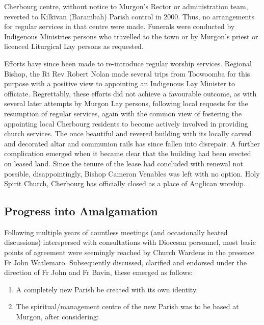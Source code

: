 Cherbourg centre, without notice to Murgon's Rector or administration team, reverted to Kilkivan (Barambah) Parish control in 2000. Thus, no arrangements for regular services in that centre were made. Funerals were conducted by Indigenous Ministries persons who travelled to the town or by Murgon's priest or licenced Liturgical Lay persons as requested.



Efforts have since been made to re-introduce regular worship services. Regional Bishop, the Rt Rev Robert Nolan made several trips from Toowoomba for this purpose with a positive view to appointing an Indigenous Lay Minister to officiate. Regrettably, these efforts did not achieve a favourable outcome, as with several later attempts by Murgon Lay persons, following local requests for the resumption of regular services, again with the common view of fostering the appointing local Cherbourg residents to become actively involved in providing church services. The once beautiful and revered building with its locally carved and decorated altar and communion rails has since fallen into disrepair. A further complication emerged when it became clear that the building had been erected on leased land. Since the tenure of the lease had concluded with renewal not possible, disappointingly, Bishop Cameron Venables was left with no option. Holy Spirit Church, Cherbourg has officially closed as a place of Anglican worship.



\subsection{Progress into Amalgamation}



Following multiple years of countless meetings (and occasionally heated discussions) interspersed with consultations with Diocesan personnel, most basic points of agreement were seemingly reached by Church Wardens in the presence Fr John Watlemaro. Subsequently discussed, clarified and endorsed under the direction of Fr John and Fr Bavin, these emerged as follows:



\begin{enumerate}

\def\labelenumi{\arabic{enumi}.}

\item

  A completely new Parish be created with its own identity.

\item

  The spiritual/management centre of the new Parish was to be based at Murgon, after considering:

\end{enumerate}



